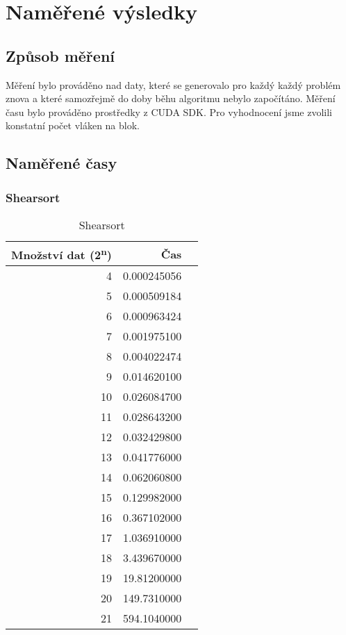 \documentclass[12pt]{article}
\begin{document}
\section{Naměřené výsledky}
\subsection{Způsob měření}
Měření bylo prováděno nad daty, které se generovalo pro každý každý problém znova a které samozřejmě do doby běhu algoritmu nebylo započítáno. Měření času bylo prováděno prostředky z CUDA SDK. Pro vyhodnocení jsme zvolili konstatní počet vláken na blok.

\subsection{Naměřené časy}
\subsubsection{Shearsort}
\begin{table}[H]
\begin{center}
\begin{tabular}{|r|r|r|}
\hline Množství dat (2\textsuperscript{n}) & Čas \\ \hline
4       &  0.000245056 \\ \hline
5       &  0.000509184 \\ \hline
6       &  0.000963424 \\ \hline
7       &  0.001975100 \\ \hline
8       &  0.004022474 \\ \hline
9       &  0.014620100 \\ \hline
10      &  0.026084700 \\ \hline
11      &  0.028643200 \\ \hline
12      &  0.032429800 \\ \hline
13      &  0.041776000 \\ \hline
14      &  0.062060800 \\ \hline
15      &  0.129982000 \\ \hline
16      &  0.367102000 \\ \hline
17      &  1.036910000 \\ \hline
18      &  3.439670000 \\ \hline
19      &  19.81200000 \\ \hline
20      &  149.7310000 \\ \hline
21      &  594.1040000 \\ \hline
\end{tabular} 
\end{center}
\caption{Shearsort}
\end{table} 
\end{document}
